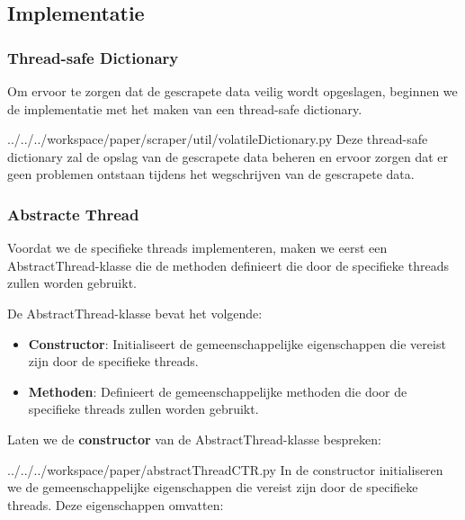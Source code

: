 \subsection{Implementatie}
\subsubsection{Thread-safe Dictionary}
Om ervoor te zorgen dat de gescrapete data veilig wordt opgeslagen, beginnen we de implementatie met het maken van een thread-safe dictionary.
\begin{pythoncode}{../../../workspace/paper/scraper/util/volatileDictionary.py}
Deze thread-safe dictionary zal de opslag van de gescrapete data beheren en ervoor zorgen dat er geen problemen ontstaan tijdens het wegschrijven van de gescrapete data.
\end{pythoncode}

\subsubsection{Abstracte Thread}
Voordat we de specifieke threads implementeren, maken we eerst een AbstractThread-klasse die de methoden definieert die door de specifieke threads zullen worden gebruikt.

De AbstractThread-klasse bevat het volgende:

\begin{itemize}
    \item \textbf{Constructor}: Initialiseert de gemeenschappelijke eigenschappen die vereist zijn door de specifieke threads.
    \item \textbf{Methoden}: Definieert de gemeenschappelijke methoden die door de specifieke threads zullen worden gebruikt.
\end{itemize}

Laten we de \textbf{constructor} van de AbstractThread-klasse bespreken:

\begin{pythoncode}{../../../workspace/paper/abstractThreadCTR.py}
    In de constructor initialiseren we de gemeenschappelijke eigenschappen die vereist zijn door de specifieke threads. Deze eigenschappen omvatten:
\end{pythoncode}

